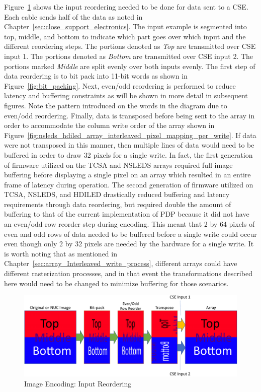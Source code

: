     Figure~\ref{fig:image_encoding} shows the input reordering needed to be done for data sent to a CSE. Each cable sends half of the data as noted in Chapter~\ref{sec:close_support_electronics}. The input example is segmented into top, middle, and bottom to indicate which part goes over which input and the different reordering steps. The portions denoted as {\it Top} are transmitted over CSE input 1. The portions denoted as {\it Bottom} are transmitted over CSE input 2. The portions marked {\it Middle} are split evenly over both inputs evenly. The first step of data reordering is to bit pack into 11-bit words as shown in Figure~\ref{fig:bit_packing}. Next, even/odd reordering is performed to reduce latency and buffering constraints as will be shown in more detail in subsequent figures. Note the pattern introduced on the words in the diagram due to even/odd reordering. Finally, data is transposed before being sent to the array in order to accommodate the column write order of the array shown in Figure~\ref{fig:nsleds_hdiled_array_interleaved_pixel_mapping_per_write}. If data were not transposed in this manner, then multiple lines of data would need to be buffered in order to draw 32 pixels for a single write. In fact, the first generation of firmware utilized on the TCSA and NSLEDS arrays required full image buffering before displaying a single pixel on an array which resulted in an entire frame of latency during operation. The second generation of firmware\cite{HouserEtAl2018} utilized on TCSA, NSLEDS, and HDILED drastically reduced buffering and latency requirements through data reordering, but
    required double the amount of buffering to that of the current implementation of PDP because it did not have an even/odd row reorder step during encoding. This meant that 2 by 64 pixels of even and odd rows of data needed to be buffered before a single write could occur even though only 2 by 32 pixels are needed by the hardware for a single write. It is worth noting that as mentioned in Chapter~\ref{sec:array_Interleaved_write_process}, different arrays could have different rasterization processes, and in that event the transformations described here would need to be changed to minimize buffering for those scenarios.

    \begin{figure}
        \centering
        \includegraphics[width=1.0\textwidth]{fig/image_encoding.pdf}
        \caption{Image Encoding: Input Reordering}
        \label{fig:image_encoding}
    \end{figure}


